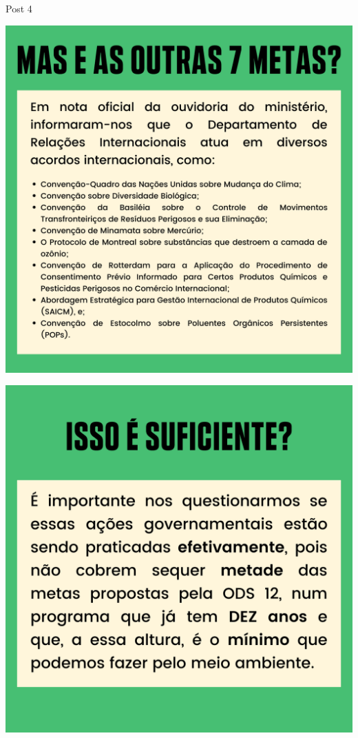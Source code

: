 \documentclass{beamer}
\begin{document}
	\begin{frame}{Post 4}
		\begin{minipage}{0.49\linewidth}
			\centering
			\includegraphics[width=\linewidth]{Post 4/5.png}
		\end{minipage}
		\hfill
		\begin{minipage}{0.49\linewidth}
			\centering
			\includegraphics[width=\linewidth]{Post 4/6.png}
		\end{minipage}
	\end{frame}
\end{document}
